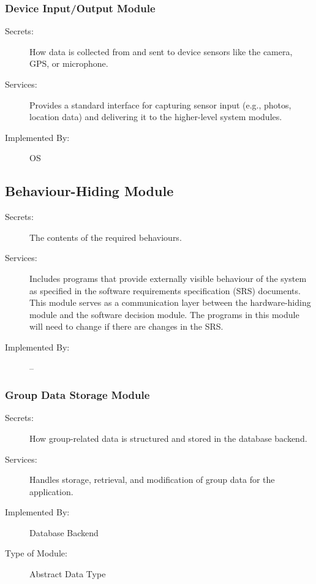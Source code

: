 \documentclass[12pt, titlepage]{article}
\begin{document}
\subsubsection{Device Input/Output Module}

\begin{description}
\item[Secrets:] How data is collected from and sent to device sensors like the camera, GPS, or microphone.
\item[Services:] Provides a standard interface for capturing sensor input (e.g., photos, location data) and delivering it to the higher-level system modules.
\item[Implemented By:] OS
\end{description}

\subsection{Behaviour-Hiding Module}

\begin{description}
\item[Secrets:] The contents of the required behaviours.
\item[Services:] Includes programs that provide externally visible behaviour of the system as specified in the software requirements specification (SRS) documents. This module serves as a communication layer between the hardware-hiding module and the software decision module. The programs in this module will need to change if there are changes in the SRS.
\item[Implemented By:] --
\end{description}

\subsubsection{Group Data Storage Module}

\begin{description}
\item[Secrets:] How group-related data is structured and stored in the database backend.
\item[Services:] Handles storage, retrieval, and modification of group data for the application.
\item[Implemented By:] Database Backend
\item[Type of Module:] Abstract Data Type
\end{description}
\end{document}
